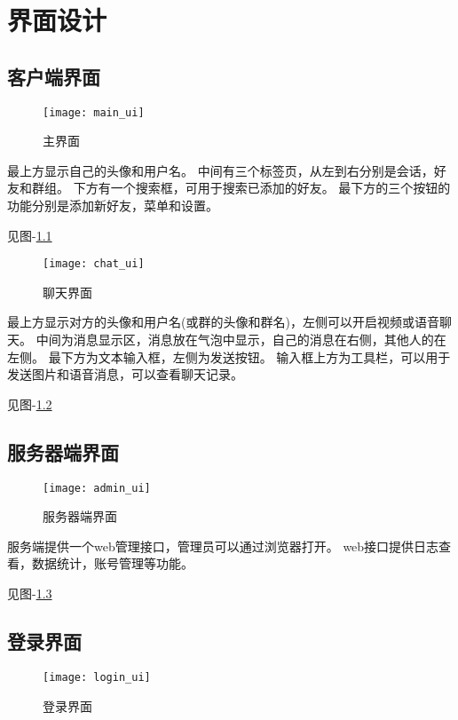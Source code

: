 \chapter{界面设计}
\section{客户端界面}
\begin{figure}[h]
	\centering
	\texttt{[image: main\_ui]}
	\caption{主界面} \label{fig:main_ui}
\end{figure}


最上方显示自己的头像和用户名。
中间有三个标签页，从左到右分别是会话，好友和群组。
下方有一个搜索框，可用于搜索已添加的好友。
最下方的三个按钮的功能分别是添加新好友，菜单和设置。

见图-\ref{fig:main_ui}

\begin{figure}[h]
	\centering
	\texttt{[image: chat\_ui]}
	\caption{聊天界面} \label{fig:chat_ui}
\end{figure}


最上方显示对方的头像和用户名(或群的头像和群名)，左侧可以开启视频或语音聊天。
中间为消息显示区，消息放在气泡中显示，自己的消息在右侧，其他人的在左侧。
最下方为文本输入框，左侧为发送按钮。
输入框上方为工具栏，可以用于发送图片和语音消息，可以查看聊天记录。

见图-\ref{fig:chat_ui}

\section{服务器端界面}

\begin{figure}[h]
	\centering
	\texttt{[image: admin\_ui]}
	\caption{服务器端界面} \label{fig:admin_ui}
\end{figure}

服务端提供一个web管理接口，管理员可以通过浏览器打开。
web接口提供日志查看，数据统计，账号管理等功能。

见图-\ref{fig:admin_ui}


\section{登录界面}

\begin{figure}[h]
	\centering
	\texttt{[image: login\_ui]}
	\caption{登录界面} \label{fig:login_ui}
\end{figure}

